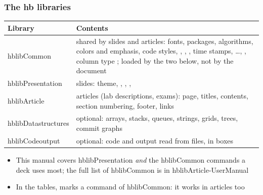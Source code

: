 \documentclass[aspectratio=169,10pt,compress]{beamer}
\begin{document}
\begin{frame}[t,fragile] \frametitle{The hb libraries}

\begin{table}
		\scriptsize
		\begin{tabular}{@{}L{0.22\textwidth}L{0.70\textwidth}@{}}
			\toprule
			\textbf{Library} & \textbf{Contents} \\
			\midrule
			hblibCommon         & shared by slides and articles: fonts, packages, algorithms, colors and emphasis,
			                      code styles, , , ,
			                      time stamps,  \dots, , column type ;
			                      loaded by the two below, not by the document \\
			hblibPresentation   & slides: theme, , , ,
			                       \\
			hblibArticle        & articles (lab descriptions, exams): page, titles, contents, section numbering, footer, links \\
			hblibDatastructures & optional: arrays, stacks, queues, strings, grids, trees, commit graphs \\
			hblibCodeoutput     & optional: code and output read from files, in boxes \\
			\bottomrule
		\end{tabular}
\end{table}%

	\begin{itemize}\small
		\item This manual covers hblibPresentation \emph{and} the hblibCommon commands a deck uses most;
		the full list of hblibCommon is in hblibArticle-UserManual
		\item In the tables,  marks a command of hblibCommon: it works in articles too
	\end{itemize}
\end{frame}
\end{document}
